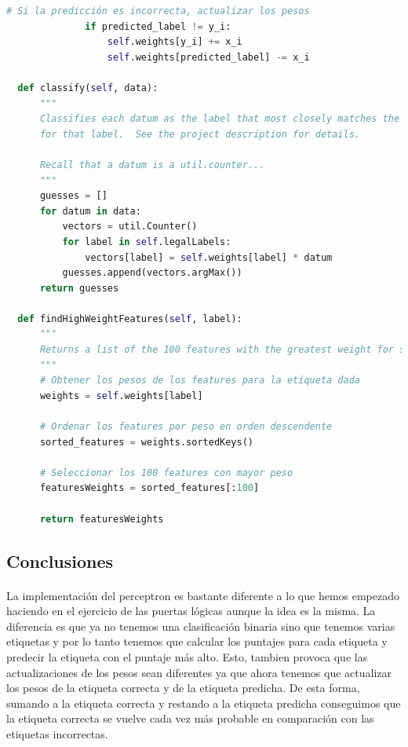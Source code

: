 \documentclass{report}
\begin{document}
\begin{lstlisting}[language=Python, caption=Implementación final del perceptron]
              # Si la predicción es incorrecta, actualizar los pesos
              if predicted_label != y_i:
                  self.weights[y_i] += x_i
                  self.weights[predicted_label] -= x_i

  def classify(self, data):
      """
      Classifies each datum as the label that most closely matches the prototype vector
      for that label.  See the project description for details.

      Recall that a datum is a util.counter...
      """
      guesses = []
      for datum in data:
          vectors = util.Counter()
          for label in self.legalLabels:
              vectors[label] = self.weights[label] * datum
          guesses.append(vectors.argMax())
      return guesses

  def findHighWeightFeatures(self, label):
      """
      Returns a list of the 100 features with the greatest weight for some label
      """
      # Obtener los pesos de los features para la etiqueta dada
      weights = self.weights[label]

      # Ordenar los features por peso en orden descendente
      sorted_features = weights.sortedKeys()

      # Seleccionar los 100 features con mayor peso
      featuresWeights = sorted_features[:100]

      return featuresWeights
        \end{lstlisting}
      \subsection*{Conclusiones}
        \paragraph*{}{
          La implementación del perceptron es bastante diferente a lo que hemos empezado haciendo en el ejercicio de las puertas lógicas aunque la idea es la misma.
          La diferencia es que ya no tenemos una clasificación binaria sino que tenemos varias etiquetas y por lo tanto tenemos que calcular los puntajes para cada etiqueta y predecir la etiqueta con el puntaje más alto.
          Esto, tambien provoca que las actualizaciones de los pesos sean diferentes ya que ahora tenemos que actualizar los pesos de la etiqueta correcta y de la etiqueta predicha.
          De esta forma, sumando a la etiqueta correcta y restando a la etiqueta predicha conseguimos que la etiqueta correcta se vuelve cada vez más probable en comparación con las etiquetas incorrectas.
        }
\end{document}
